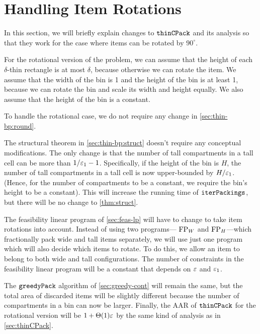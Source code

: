 \section{Handling Item Rotations}
\label{sec:thin-bp:rot}

In this section, we will briefly explain changes to $\operatorname{\mathtt{thinCPack}}$ and its analysis
so that they work for the case where items can be rotated by $90^{\circ}$.

For the rotational version of the problem, we can assume \wLoG{} that
the height of each $\delta$-thin rectangle is at most $\delta$,
because otherwise we can rotate the item.
We assume \wLoG{} that the width of the bin is 1
and the height of the bin is at least 1,
because we can rotate the bin and scale its width and height equally.
We also assume that the height of the bin is a constant.

To handle the rotational case, we do not require any change in \cref{sec:thin-bp:round}.

The structural theorem in \cref{sec:thin-bp:struct} doesn't require any
conceptual modifications. The only change is that the number of tall compartments
in a tall cell can be more than $1/\varepsilon_1-1$.
Specifically, if the height of the bin is $H$, the number of tall compartments
in a tall cell is now upper-bounded by $H/\varepsilon_1$.
(Hence, for the number of compartments to be a constant,
we require the bin's height to be a constant).
This will increase the running time of $\operatorname{\mathtt{iterPackings}}$,
but there will be no change to \cref{thm:struct}.

The feasibility linear program of \cref{sec:feas-lp} will have to change
to take item rotations into account. Instead of using two programs---%
$\operatorname{FP}_W$ and $\operatorname{FP}_H$---which fractionally pack wide and tall items separately,
we will use just one program which will also decide which items to rotate.
To do this, we allow an item to belong to both wide and tall configurations.
The number of constraints in the feasibility linear program will
be a constant that depends on $\varepsilon$ and $\varepsilon_1$.

The $\operatorname{\mathtt{greedyPack}}$ algorithm of \cref{sec:greedy-cont} will remain the same,
but the total area of discarded items will be slightly different because
the number of compartments in a bin can now be larger.
Finally, the AAR of $\operatorname{\mathtt{thinCPack}}$ for the rotational version will be $1 + \Theta(1)\varepsilon$
by the same kind of analysis as in \cref{sec:thinCPack}.
